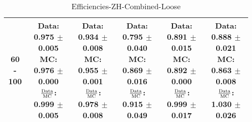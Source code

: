\documentclass[final,letterpaper,twoside,12pt]{article}
\begin{document}
\begin{table}[htbp]
\begin{adjustwidth}{-4em}{-4em}
\begin{tabular}{|c|c|c|c|c|c|}
60 - 100 & \parbox[c]{1.1 in}{ \scriptsize  Data: 0.975 $\pm$ 0.005 \newline MC: 0.976 $\pm$ 0.000 \newline $\frac{\rm{Data}}{\rm{MC}}$: 0.999 $\pm$ 0.005} & \parbox[c]{1.1 in}{ \scriptsize  Data: 0.934 $\pm$ 0.008 \newline MC: 0.955 $\pm$ 0.001 \newline $\frac{\rm{Data}}{\rm{MC}}$: 0.978 $\pm$ 0.008} & \parbox[c]{1.1 in}{ \scriptsize  Data: 0.795 $\pm$ 0.040 \newline MC: 0.869 $\pm$ 0.016 \newline $\frac{\rm{Data}}{\rm{MC}}$: 0.915 $\pm$ 0.049} & \parbox[c]{1.1 in}{ \scriptsize  Data: 0.891 $\pm$ 0.015 \newline MC: 0.892 $\pm$ 0.000 \newline $\frac{\rm{Data}}{\rm{MC}}$: 0.999 $\pm$ 0.017} & \parbox[c]{1.1 in}{ \scriptsize  Data: 0.888 $\pm$ 0.021 \newline MC: 0.863 $\pm$ 0.008 \newline $\frac{\rm{Data}}{\rm{MC}}$: 1.030 $\pm$ 0.026}\\ \hline 
\end{tabular}
\caption {Efficiencies-ZH-Combined-Loose}
\label{tab:cqdata0}
\end{adjustwidth}\end{table}
\end{document}
